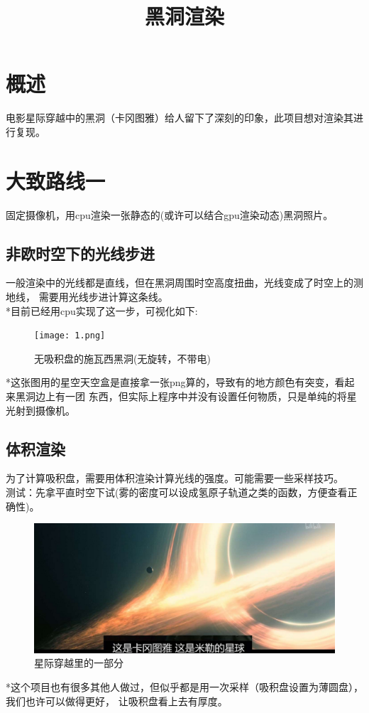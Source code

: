 \documentclass[a4paper, 12pt]{article}
\begin{document}
	\title{黑洞渲染}
    \section{概述}
    电影星际穿越中的黑洞（卡冈图雅）给人留下了深刻的印象，此项目想对渲染其进行复现。
    \section{大致路线一}
    固定摄像机，用cpu渲染一张静态的(或许可以结合gpu渲染动态)黑洞照片。
    \subsection{非欧时空下的光线步进}
    一般渲染中的光线都是直线，但在黑洞周围时空高度扭曲，光线变成了时空上的测地线，
    需要用光线步进计算这条线。\\
    *目前已经用cpu实现了这一步，可视化如下:
    \begin{figure}[H]
        \texttt{[image: 1.png]}
        \caption{无吸积盘的施瓦西黑洞(无旋转，不带电)} %
    \end{figure}
    *这张图用的星空天空盒是直接拿一张png算的，导致有的地方颜色有突变，看起来黑洞边上有一团
    东西，但实际上程序中并没有设置任何物质，只是单纯的将星光射到摄像机。
    \subsection{体积渲染}
    为了计算吸积盘，需要用体积渲染计算光线的强度。可能需要一些采样技巧。\\
    测试：先拿平直时空下试(雾的密度可以设成氢原子轨道之类的函数，方便查看正确性)。\\
    \begin{figure}[H]
        \includegraphics[width=1.0\textwidth]{2.png}
        \caption{星际穿越里的一部分} %
    \end{figure}
    *这个项目也有很多其他人做过，但似乎都是用一次采样（吸积盘设置为薄圆盘），我们也许可以做得更好，
    让吸积盘看上去有厚度。
\end{document}
